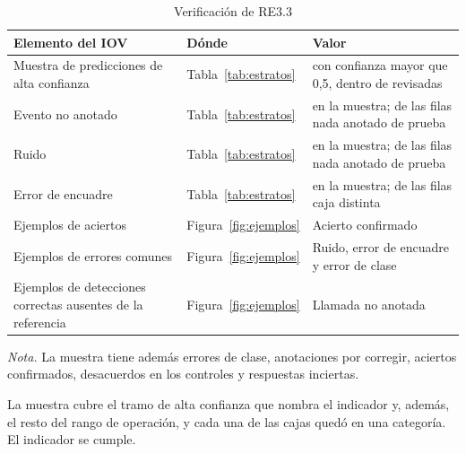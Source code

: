 \begin{table}[htbp]
    \centering
    \small
    \begin{threeparttable}
        \caption{Verificación de RE3.3}
        \label{tab:verificacion-re33}
        \begin{tabular}{@{}L{4.5cm}L{3.3cm}L{5.5cm}@{}}
            \toprule
            \textbf{Elemento del IOV} & \textbf{Dónde} & \textbf{Valor} \\
            \midrule
            Muestra de predicciones de alta confianza & Tabla~\ref{tab:estratos} & \uTopSample{} con confianza mayor que 0,5, dentro de \uItems{} revisadas \\
            Evento no anotado & Tabla~\ref{tab:estratos} & \uCatUnannotated{} en la muestra; \uNoneReal{} de las filas nada anotado de prueba \\
            Ruido & Tabla~\ref{tab:estratos} & \uCatNoise{} en la muestra; \uNoneNoise{} de las filas nada anotado de prueba \\
            Error de encuadre & Tabla~\ref{tab:estratos} & \uCatFraming{} en la muestra; \uBoxModelFraming{} de las filas caja distinta \\
            Ejemplos de aciertos & Figura~\ref{fig:ejemplos} & Acierto confirmado \\
            Ejemplos de errores comunes & Figura~\ref{fig:ejemplos} & Ruido, error de encuadre y error de clase \\
            Ejemplos de detecciones correctas ausentes de la referencia & Figura~\ref{fig:ejemplos} & Llamada no anotada \\
            \bottomrule
        \end{tabular}
        \begin{tablenotes}[flushleft]
            \footnotesize
            \item \textit{Nota.} La muestra tiene además \uCatClass{} errores de
            clase, \uCatFix{} anotaciones por corregir, \uCatConfirmed{} aciertos
            confirmados, \uCatDisagree{} desacuerdos en los controles y
            \uCatUnsure{} respuestas inciertas.
        \end{tablenotes}
    \end{threeparttable}
\end{table}

La muestra cubre el tramo de alta confianza que nombra el indicador y, además, el
resto del rango de operación, y cada una de las \uItems{} cajas quedó en una
categoría. El indicador se cumple.

